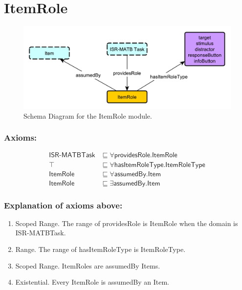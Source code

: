 \newpage
\section{ItemRole}
\label{ssec:itemrole}

\begin{figure}[h!]
\begin{center}
\includegraphics[width=.8\textwidth]{resources/ItemRole.pdf}
\end{center}
\caption{Schema Diagram for the \textsf{ItemRole} module.}
\label{fig:itemrole}
\end{figure}

\subsubsection*{Axioms:}

\begin{align}
\textsf{ISR-MATBTask} &\sqsubseteq \forall\textsf{providesRole.ItemRole} \\
\top &\sqsubseteq \forall \textsf{hasItemRoleType.ItemRoleType} \\
\textsf{ItemRole} &\sqsubseteq \forall\textsf{assumedBy.Item} \\
\textsf{ItemRole} &\sqsubseteq \exists\textsf{assumedBy.Item}
\end{align}

\subsubsection*{Explanation of axioms above:}

\begin{enumerate}
\item Scoped Range. The range of \textsf{providesRole} is \textsf{ItemRole} when the domain is \textsf{ISR-MATBTask}.
\item Range. The range of \textsf{hasItemRoleType} is \textsf{ItemRoleType}.
\item Scoped Range. \textsf{ItemRoles} are \textsf{assumedBy} \textsf{Items}.
\item Existential. Every \textsf{ItemRole} is \textsf{assumedBy} an \textsf{Item}.
\end{enumerate}

